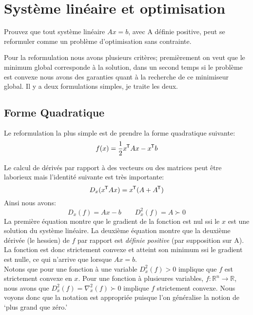 \clearpage

\section{Syst\`eme lin\'eaire et optimisation}
Prouvez que tout système linéaire $Ax = b$, avec A définie positive, peut se
reformuler comme un problème d’optimisation sans contrainte. 

Pour la reformulation nous avons plusieurs crit\`eres; premi\`erement on veut
que le minimum global corresponde \`a la solution, dans un second temps
si le probl\`eme est convexe nous avons des garanties quant \`a la recherche
de ce minimiseur global. Il y a deux formulations simples, je traite les
deux.
\subsection{Forme Quadratique}
Le reformulation la plus simple est de prendre la forme quadratique suivante:\\
\begin{equation}
    f(x) = \frac{1}{2}x^{\mkern-1.5mu\mathsf{T}} A x - x^{\mkern-1.5mu\mathsf{T}} b
\end{equation}

Le calcul de d\'eriv\'es par rapport \`a des vecteurs ou des matrices
peut \^etre laborieux mais l'identit\'e suivante est tr\`es importante:
\begin{equation}
    D_x (x^{\mkern-1.5mu\mathsf{T}} A x) = x^{\mkern-1.5mu\mathsf{T}} (A + A^{\mkern-1.5mu\mathsf{T}})
\end{equation}
Ainsi nous avons:
\begin{equation}
    D_x(f) = Ax - b \qquad D_x^2(f) = A \succ 0
\end{equation}
La premi\`ere \'equation montre que le gradient de la fonction est nul ssi le
$x$ est une solution du syst\`eme lin\'eaire. La deuxi\`eme \'equation montre
que la deuxi\`eme d\'eriv\'ee (le hessien) de $f$ par rapport est
\emph{d\'efinie positive} (par supposition sur A). La fonction est donc
strictement convexe et atteint son minimum ssi le gradient est nulle, ce qui
n'arrive que lorsque $Ax = b$. \\

Notons que pour une fonction \`a une variable $D^2_x(f) > 0$ implique
que $f$ est strictement convexe en $x$. Pour une fonction \`a plusieures
variables, $f : \mathbb R^n \rightarrow \mathbb R$, nous avons que $D^2_x(f) =
\nabla^2_x (f) \succ 0$ implique $f$ strictement convexe. Nous voyons donc
que la notation est appropri\'ee puisque l'on g\'en\'eralise la notion de
`plus grand que z\'ero.'




